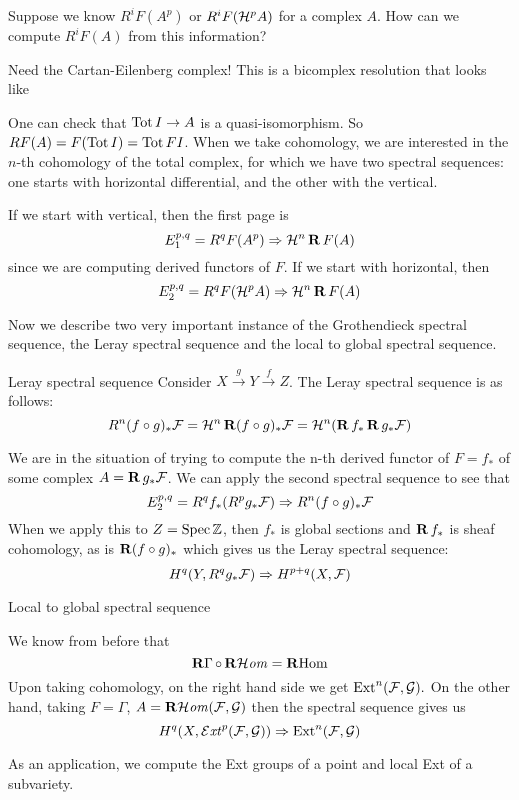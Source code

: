 Suppose we know $R^iF(A^p)$ or $R^iF(\mathcal{H}^pA)$ for a complex $A$. How can we compute $R^iF(A)$ from this information?

Need the Cartan-Eilenberg complex! This is a bicomplex resolution that looks like %

One can check that $\operatorname{Tot} I \rightarrow A$ is a quasi-isomorphism. So $RF(A)=F(\operatorname{Tot} I)=\operatorname{Tot} FI$. When we take cohomology, we are interested in the $n$-th cohomology of the total complex, for which we have two spectral sequences: one starts with horizontal differential, and the other with the vertical.

If we start with vertical, then the first page is $$E_{1}^{p,q}=R^qF(A^p)\Rightarrow \mathcal{H}^n\operatorname{\mathbf{R}} F(A)$$since we are computing derived functors of $F$. If we start with horizontal, then $$E_{2}^{p,q}=R^qF(\mathcal{H}^pA)\Rightarrow\mathcal{H}^n\operatorname{\mathbf{R}} F(A)$$

Now we describe two very important instance of the Grothendieck spectral sequence, the Leray spectral sequence and the local to global spectral sequence.

\begin{example}{Leray spectral sequence}{} Consider $X\xrightarrow{g} Y \xrightarrow{f} Z$. The Leray spectral sequence is as follows: $$R^n(f\circ g)_{*}\mathcal{F}=\mathcal{H}^n\operatorname{\mathbf{R}}(f\circ g)_{*}\mathcal{F}=\mathcal{H}^n(\operatorname{\mathbf{R}} f_*\operatorname{\mathbf{R}} g_*\mathcal{F})$$

We are in the situation of trying to compute the n-th derived functor of $F=f_*$ of some complex $A=\operatorname{\mathbf{R}} g_*\mathcal{F}$. We can apply the second spectral sequence to see that $$E_{2}^{p,q}=R^qf_{*}(R^pg_{*}\mathcal{F})\Rightarrow R^n(f\circ g)_{*} \mathcal{F}$$
When we apply this to $Z=\operatorname{Spec}\mathbb{Z}$, then $f_*$ is global sections and $\operatorname{\mathbf{R}} f_*$ is sheaf cohomology, as is $\operatorname{\mathbf{R}}(f\circ g)_*$ which gives us the Leray spectral sequence: $$H^q(Y, R^qg_{*}\mathcal{F})\Rightarrow H^{p+q}(X,\mathcal{F})$$
\end{example}



\begin{example}{Local to global spectral sequence}{}

We know from before that $$\operatorname{\mathbf{R}\Gamma}\circ \operatorname{\mathbf{R}\mathcal{H}\mathit{om}}=\operatorname{\mathbf{R}Hom}$$
Upon taking cohomology, on the right hand side we get $\operatorname{Ext}^n(\mathcal{F}, \mathcal{G}).$ On the other hand, taking $F=\Gamma$, $A=\operatorname{\mathbf{R}\mathcal{H}\mathit{om}}(\mathcal{F}, \mathcal{G})$ then the spectral sequence gives us $$H^q(X, \operatorname{\mathcal{E}\mathit{xt}}^p(\mathcal{F}, \mathcal{G}))\Rightarrow \operatorname{Ext}^n(\mathcal{F},\mathcal{G})$$ \end{example}

As an application, we compute the Ext groups of a point and local Ext of a subvariety.

